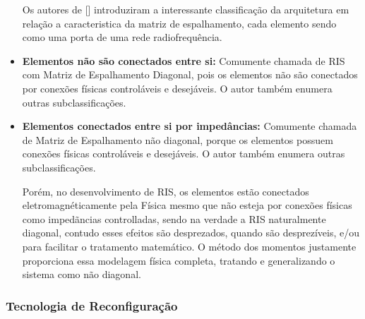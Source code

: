 \documentclass[
	12pt,				%
	openright,			%
	oneside,			%
	a4paper,			%
	english,			%
	brazil				%
	]{abntex2}
\begin{document}
\begin{itemize}

Os autores de [] introduziram a interessante classificação da arquitetura em relação a caracteristica da matriz de espalhamento, cada elemento sendo como uma porta de uma rede radiofrequência.

\item \textbf{Elementos não são conectados entre si:} Comumente chamada de RIS com Matriz de Espalhamento Diagonal, pois os elementos não são conectados por conexões físicas controláveis e desejáveis. O autor também enumera outras subclassificações.

\item \textbf{Elementos conectados entre si por impedâncias:} Comumente chamada de Matriz de Espalhamento não diagonal, porque os elementos possuem conexões físicas controláveis e desejáveis. O autor também enumera outras subclassificações.

Porém, no desenvolvimento de RIS, os elementos estão conectados eletromagnéticamente pela Física mesmo que não esteja por conexões físicas como impedãncias controlladas, sendo na verdade a RIS naturalmente diagonal, contudo esses efeitos são desprezados, quando são desprezíveis, e/ou para facilitar o tratamento matemático. O método dos momentos justamente proporciona essa modelagem física completa, tratando e generalizando o sistema como não diagonal.

\end{itemize}

\subsubsection{Tecnologia de Reconfiguração } 
\end{document}
